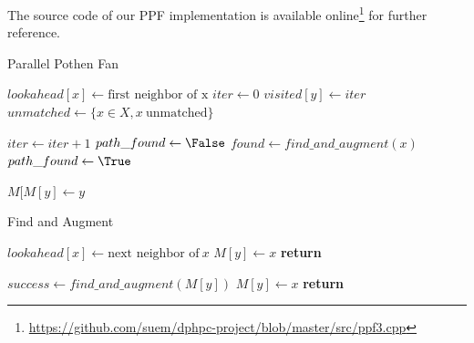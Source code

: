 \documentclass[letterpaper]{article}
\begin{document}
The source code of our PPF implementation is available online\footnote{\url{https://github.com/suem/dphpc-project/blob/master/src/ppf3.cpp}} for further reference.\\

\begin{algorithm}
    \caption{Parallel Pothen Fan}
    \label{alg:ppf}
    \begin{algorithmic}[1]

        \State $lookahead[x] \gets \text{first neighbor of x}$ 
        \State $iter \gets 0$
        \State $visited[y] \gets iter$ 
        \State $unmatched \gets \{x \in X, x \ \text{unmatched}\}$

        \Repeat 
            \State $iter \gets iter + 1$        
            \State $path\_found \gets \False$        
                \State \Continue {}
            \EndIf
            \State $found \gets find\_and\_augment(x)$        
                \State $path\_found \gets \True$        
            \EndIf
        \EndFor

            \State $M[M[y] \gets y$        
        \EndFor
        
        \EndProcedure
    \end{algorithmic}
\end{algorithm}


\begin{algorithm}
    \caption{Find and Augment}
    \label{alg:fa}
    \begin{algorithmic}[1]


                \State $lookahead[x] \gets \text{next neighbor of}\ x$
                        \State $M[y] \gets x$ 
                        \State \textbf{return} \True
                    \EndIf
                \EndIf
            \EndFor
            
                    \State $success \gets find\_and\_augment(M[y])$
                        \State $M[y] \gets x$ 
                        \State \textbf{return} \True
                    \EndIf
                \EndIf
            \EndFor
        \EndProcedure
    \end{algorithmic}
\end{algorithm}
\end{document}
